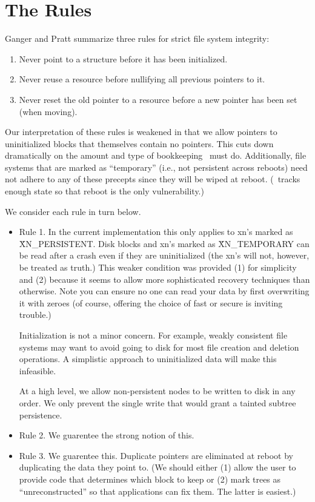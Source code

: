 \section{The Rules}

Ganger and Pratt summarize three rules for strict file system integrity:
\begin{enumerate}
      	\item Never point to a structure before it has been initialized.

        \item Never reuse a resource before nullifying all previous
        pointers to it.

	\item Never reset the old pointer to a resource before a new
	pointer has been set (when moving).

\end{enumerate}

Our interpretation of these rules is weakened in that we allow pointers
to uninitialized blocks that themselves contain no pointers.  This cuts
down dramatically on the amount and type of bookkeeping \xxx\ must do.
Additionally, file systems that are marked  as ``temporary'' (i.e., not
persistent across reboots) need not adhere to any of these precepts
since they will be wiped at reboot.  (\xxx\ tracks enough state so that
reboot is the only vulnerability.)

We consider each rule in turn below.

\begin{itemize}
	\item Rule 1.  In the current implementation this only applies
	to xn's marked as \v{XN\_PERSISTENT}.  Disk blocks and xn's marked
	as \v{XN\_TEMPORARY} can be read after a crash even if they are
	uninitialized (the xn's will not, however, be treated as truth.)  This
	weaker condition was provided (1) for simplicity and (2) because it
	seems to allow more sophisticated recovery techniques than otherwise.
	Note you can ensure no one can read your data by first overwriting it
	with zeroes (of course, offering the choice of fast or secure is
	inviting trouble.)

	Initialization is not a minor concern.  For example, weakly
	consistent file systems may want to avoid going to disk for
	most file creation and deletion operations.  A simplistic
	approach to uninitialized data will make this infeasible.
	
	At a high level, we allow non-persistent nodes to be written
	to disk in any order.  We only prevent the single write that
	would grant a tainted subtree persistence.

       	\item Rule 2. We guarentee the strong notion of this.

	\item Rule 3.  We guarentee this.  Duplicate pointers are
	eliminated at reboot by duplicating the data they point to.
	(We should either (1) allow the user to provide code that
	determines which block to keep or (2) mark trees as
	``unreconstructed'' so that applications can fix them.  The
	latter is easiest.)

\end{itemize}

